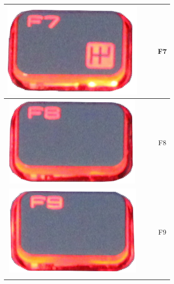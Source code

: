 \begin{longtable}{cccc}
\hline
\begin{minipage}[c]{.3\textwidth}
\vspace{0.2cm}
\includegraphics[scale=0.1]{Images/KeyMapping/F7}
\vspace{0.2cm}
\end{minipage} & & & F7\\
\hline
\begin{minipage}[c]{.3\textwidth}
\vspace{0.2cm}
\includegraphics[scale=0.1]{Images/KeyMapping/F8}
\vspace{0.2cm}
\end{minipage} & & & F8\\
\hline
\begin{minipage}[c]{.3\textwidth}
\vspace{0.2cm}
\includegraphics[scale=0.1]{Images/KeyMapping/F9}
\vspace{0.2cm}
\end{minipage} & & & F9\\
\hline
\begin{minipage}[c]{.3\textwidth}
\vspace{0.2cm}

\end{minipage}
\end{longtable}
